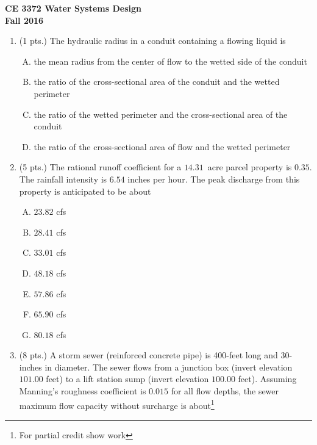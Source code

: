 \documentclass[11pt]{article}
\begin{document}
\begingroup
\begin{center}
{\textbf{{ CE 3372 Water Systems Design}  \\ Fall 2016} }
\end{center}
\endgroup


\begin{enumerate}
\item  (1 pts.)
The hydraulic radius in a conduit containing a flowing liquid is
\begin{enumerate} [(A)]
\item	the mean radius from the center of flow to the wetted side of the conduit
\item	the ratio of the cross-sectional area of the conduit and the wetted perimeter
\item	the ratio of the wetted perimeter and the cross-sectional area of the conduit
\item	the ratio of the cross-sectional area of flow and the wetted perimeter
\end{enumerate}
\item (5 pts.)
The rational runoff coefficient for a $14.31$~acre parcel property is $0.35$.  
The rainfall intensity is $6.54$ inches per hour.  
The peak discharge from this property is anticipated to be about
\begin{enumerate} [(A)]
\item $23.82$ cfs
\item $28.41$ cfs
\item $33.01$ cfs
\item $48.18$ cfs
\item $57.86$ cfs
\item $65.90$ cfs
\item $80.18$ cfs
\end{enumerate}
\item  (8 pts.)
A storm sewer (reinforced concrete pipe) is 400-feet long and 30-inches in diameter.  The sewer flows from a junction box (invert elevation $101.00$ feet) to a lift station sump (invert elevation $100.00$ feet).  Assuming Manning's roughness coefficient is $0.015$ for all flow depths, the sewer maximum flow capacity without surcharge is about\footnote{For partial credit show work}

\end{enumerate}
\end{document}
